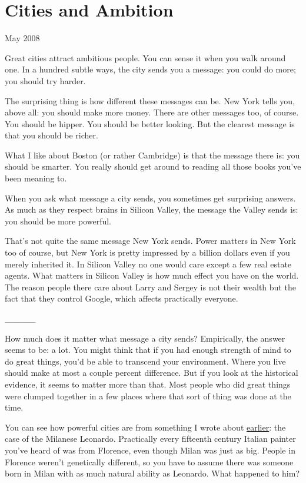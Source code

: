 \chapter{Cities and Ambition}

May 2008

Great cities attract ambitious people. You can sense it when you walk
around one. In a hundred subtle ways, the city sends you a message: you
could do more; you should try harder.

The surprising thing is how different these messages can be. New York
tells you, above all: you should make more money. There are other
messages too, of course. You should be hipper. You should be better
looking. But the clearest message is that you should be richer.

What I like about Boston (or rather Cambridge) is that the message there
is: you should be smarter. You really should get around to reading all
those books you've been meaning to.

When you ask what message a city sends, you sometimes get surprising
answers. As much as they respect brains in Silicon Valley, the message
the Valley sends is: you should be more powerful.

That's not quite the same message New York sends. Power matters in New
York too of course, but New York is pretty impressed by a billion
dollars even if you merely inherited it. In Silicon Valley no one would
care except a few real estate agents. What matters in Silicon Valley is
how much effect you have on the world. The reason people there care
about Larry and Sergey is not their wealth but the fact that they
control Google, which affects practically everyone.

\_\_\_\_\_

How much does it matter what message a city sends? Empirically, the
answer seems to be: a lot. You might think that if you had enough
strength of mind to do great things, you'd be able to transcend your
environment. Where you live should make at most a couple percent
difference. But if you look at the historical evidence, it seems to
matter more than that. Most people who did great things were clumped
together in a few places where that sort of thing was done at the time.

You can see how powerful cities are from something I wrote about
\href{taste.html}{earlier}: the case of the Milanese Leonardo.
Practically every fifteenth century Italian painter you've heard of was
from Florence, even though Milan was just as big. People in Florence
weren't genetically different, so you have to assume there was someone
born in Milan with as much natural ability as Leonardo. What happened to
him?

